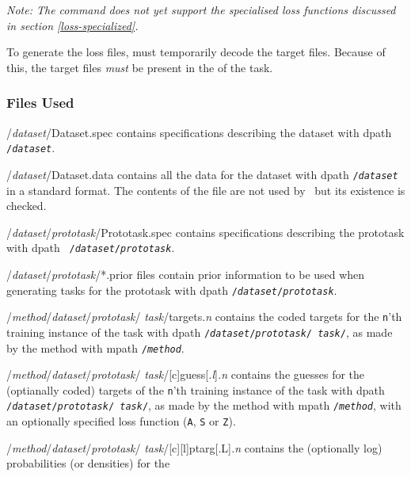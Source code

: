 \emph{Note: The \mloss{} command does not yet support the specialised loss
functions discussed in section \ref{loss-specialized}.}

To generate the loss files, \mloss{} must temporarily decode the
target files.  Because of this, the target files \emph{must} be
present in the \mpath{} of the task.

\subsubsection*{Files Used}
\begin{ttdescription}
\item[/{\rm\em dataset\/}/Dataset.spec]
    contains specifications describing the dataset with dpath {\tt
    /{\rm\em dataset}}.
\item[/{\rm\em dataset\/}/Dataset.data]
    contains all the data for the dataset with dpath \texttt{/{\rm\em dataset}}
    in a \delve{} standard format.  The contents of the file are not
    used by \dinfo\, but its existence is checked.
\item[/{\rm\em dataset\/}/{\rm\em prototask\/}/Prototask.spec]
    contains specifications describing the prototask with dpath {\tt
    /{\rm\em dataset\/}/{\rm\em prototask}}.
\item[/{\rm\em dataset\/}/{\rm\em prototask\/}/*.prior]
    files contain prior information to be used when generating tasks for 
    the prototask with dpath \texttt{/{\rm\em dataset\/}/{\rm\em prototask}}.
\item[/{\rm\em method\/}/{\rm\em dataset\/}/{\rm\em prototask\/}/{\rm\em 
       task\/}/targets.{\sl n}]
    contains the coded targets for the \texttt{n}'th training instance of the 
    task with dpath \texttt{/{\rm\em dataset\/}/{\rm\em prototask\/}/{\rm\em 
    task\/}/}, as made by the method with mpath \texttt{/{\rm\em method}}.
\item[/{\rm\em method\/}/{\rm\em dataset\/}/{\rm\em prototask\/}/{\rm\em 
       task\/}/{[c]}guess{[{\sl .l\/}]}{\sl .n}]
    contains the guesses for the (optianally coded) targets of the
    \texttt{n}'th training instance of the task with dpath
    \texttt{/{\rm\em dataset\/}/{\rm\em prototask\/}/{\rm\em 
    task\/}/}, as made by the method with mpath \texttt{/{\rm\em method}},
    with an optionally specified loss function (\texttt{A}, \texttt{S} or
    \texttt{Z}).
\item[/{\rm\em method\/}/{\rm\em dataset\/}/{\rm\em prototask\/}/{\rm\em 
       task\/}/{[c][l]}ptarg{[.L]}{\sl .n}]
    contains the (optionally log) probabilities (or densities) for the

\end{ttdescription}

